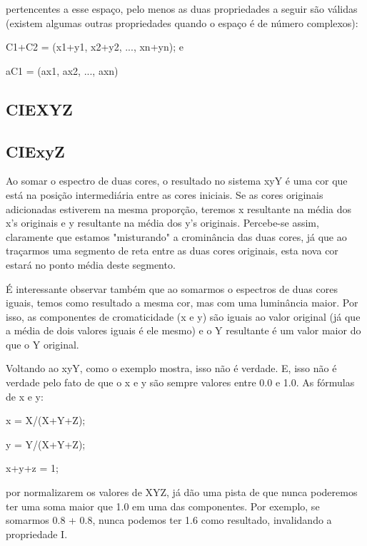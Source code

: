 \documentclass[a4paper,10pt]{report}
\begin{document}
\par
pertencentes a esse espaço, pelo menos as duas propriedades a seguir são válidas
(existem algumas outras propriedades quando o espaço é de número complexos):

\begin{list}{:~}{}
\item C1+C2 = (x1+y1, x2+y2, ..., xn+yn); e
\item aC1 = (ax1, ax2, ..., axn)
\end{list}
\subsection{CIEXYZ}

\subsection{CIExyZ}
\par
Ao somar o espectro de duas cores, o resultado no sistema xyY é uma cor que está
na posição intermediária entre as cores iniciais. Se as cores originais
adicionadas estiverem na mesma proporção, teremos x resultante na média dos x's
originais e y resultante na média dos y's originais. Percebe-se assim,
claramente que estamos "misturando" a crominância das duas cores, já que ao
traçarmos uma segmento de reta entre as duas cores originais, esta nova cor
estará no ponto média deste segmento.

\par
É interessante observar também que ao somarmos o espectros de duas cores iguais,
temos como resultado a mesma cor, mas com uma luminância maior. Por isso, as
componentes de cromaticidade (x e y) são iguais ao valor original (já que a
média de dois valores iguais é ele mesmo) e o Y resultante é um valor maior do
que o Y original.

\par
Voltando ao xyY, como o exemplo mostra, isso não é verdade. E, isso não é
verdade pelo fato de que o x e y são sempre valores entre 0.0 e 1.0. As fórmulas
de x e y:

\begin{list}
\item x = X/(X+Y+Z); 
\item y = Y/(X+Y+Z);
\item x+y+z = 1;
\end{list}

por normalizarem os valores de XYZ, já dão uma pista de que nunca poderemos ter
uma soma maior que 1.0 em uma das componentes. Por exemplo, se somarmos 0.8 +
0.8, nunca podemos ter 1.6 como resultado, invalidando a propriedade I.
\end{document}
